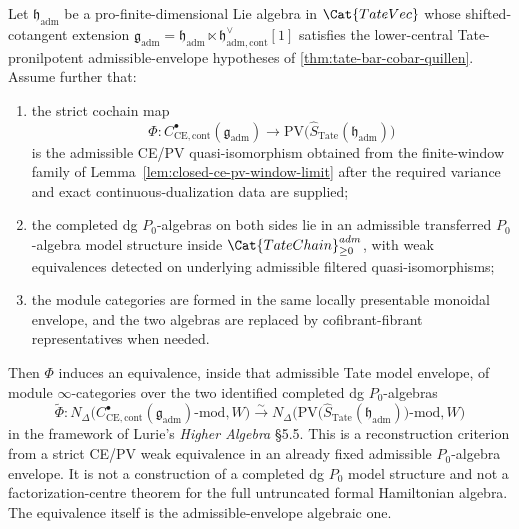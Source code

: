 \begin{thm}
\label{thm:admissible-envelope-module-reconstruction}
  Let $\mathfrak h_{\mathrm{adm}}$ be a pro-finite-dimensional Lie algebra in
  $\Cat{TateVec}$ whose shifted-cotangent extension
  $\mathfrak g_{\mathrm{adm}}
  =\mathfrak h_{\mathrm{adm}}\ltimes
  \mathfrak h_{\mathrm{adm},\mathrm{cont}}^\vee[1]$
  satisfies the lower-central Tate-pronilpotent admissible-envelope hypotheses of
  \ref{thm:tate-bar-cobar-quillen}.  Assume further that:
  \begin{enumerate}[label=(M\arabic*)]
    \item the strict cochain map
  $$\Phi\colon C^\bullet_{\mathrm{CE},\mathrm{cont}}(\mathfrak g_{\mathrm{adm}})
    \longrightarrow \mathrm{PV}\bigl(
    \widehat S_{\mathrm{Tate}}(\mathfrak h_{\mathrm{adm}})\bigr)$$
      is the admissible CE/PV quasi-isomorphism obtained from the
      finite-window family of Lemma~\ref{lem:closed-ce-pv-window-limit}
      after the required variance and exact continuous-dualization data
      are supplied;
    \item the completed dg \(P_0\)-algebras on both sides lie in an
      admissible transferred \(P_0\)-algebra model structure inside
      \(\Cat{TateChain}_{\geq0}^{\mathrm{adm}}\), with weak
      equivalences detected on underlying admissible filtered
      quasi-isomorphisms;
    \item the module categories are formed in the same locally
      presentable monoidal envelope, and the two algebras are replaced by
      cofibrant-fibrant representatives when needed.
  \end{enumerate}
  Then \(\Phi\) induces an equivalence, inside that admissible Tate
  model envelope, of module $\infty$-categories over the two identified
  completed dg \(P_0\)-algebras
  $$\widetilde\Phi\colon
    N_\Delta\bigl(C^\bullet_{\mathrm{CE},\mathrm{cont}}(\mathfrak g_{\mathrm{adm}})
      \text{-mod},W\bigr)
    \xrightarrow{\sim}
    N_\Delta\bigl(\mathrm{PV}\bigl(\widehat S_{\mathrm{Tate}}(\mathfrak h_{\mathrm{adm}})
      \bigr)\text{-mod},W\bigr)$$
	  in the framework of Lurie's \emph{Higher Algebra} \S 5.5.  This is
	  a reconstruction criterion from a strict CE/PV weak equivalence in an
	  already fixed admissible \(P_0\)-algebra envelope.  It is not a
	  construction of a completed dg \(P_0\) model structure and not a
	  factorization-centre theorem for the full untruncated formal
	  Hamiltonian algebra. The equivalence itself is the
	  admissible-envelope algebraic one.
\end{thm}

